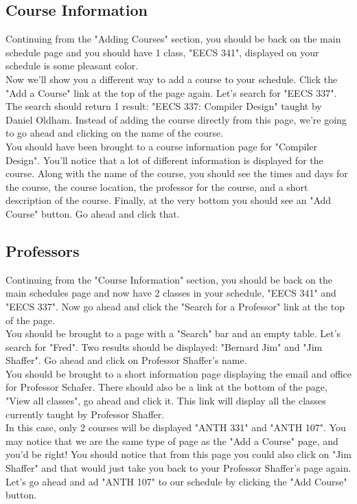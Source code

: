 \documentclass[pdftex,12pt,letter]{article}
\begin{document}
\subsection{Course Information} 
Continuing from the "Adding Courses" section, you should be back on the main schedule page and you should have 1 class, "EECS 341", displayed on your schedule is some pleasant color.\\

Now we'll show you a different way to add a course to your schedule. Click the "Add a Course" link at the top of the page again. Let's search for "EECS 337". The search should return 1 result: "EECS 337: Compiler Design" taught by Daniel Oldham. Instead of adding the course directly from this page, we're going to go ahead and clicking on the name of the course.\\

You should have been brought to a course information page for "Compiler Design". You'll notice that a lot of different information is displayed for the course. Along with the name of the course, you should see the times and days for the course, the course location, the professor for the course, and a short description of the course. Finally, at the very bottom you should see an "Add Course" button. Go ahead and click that.

\subsection{Professors}
Continuing from the "Course Information" section, you should be back on the main schedules page and now have 2 classes in your schedule, "EECS 341" and "EECS 337". Now go ahead and click the "Search for a Professor" link at the top of the page.\\

You should be brought to a page with a "Search" bar and an empty table. Let's search for "Fred". Two results should be displayed: "Bernard Jim" and "Jim Shaffer". Go ahead and click on Professor Shaffer's name.\\

You should be brought to a short information page displaying the email and office for Professor Schafer. There should also be a link at the bottom of the page, "View all classes", go ahead and click it. This link will display all the classes currently taught by Professor Shaffer.\\

In this case, only 2 courses will be displayed "ANTH 331" and "ANTH 107". You may notice that we are the same type of page as the "Add a Course" page, and you'd be right! You should notice that from this page you could also click on "Jim Shaffer" and that would just take you back to your Professor Shaffer's page again. Let's go ahead and ad "ANTH 107" to our schedule by clicking the "Add Course" button.\\
\end{document}
